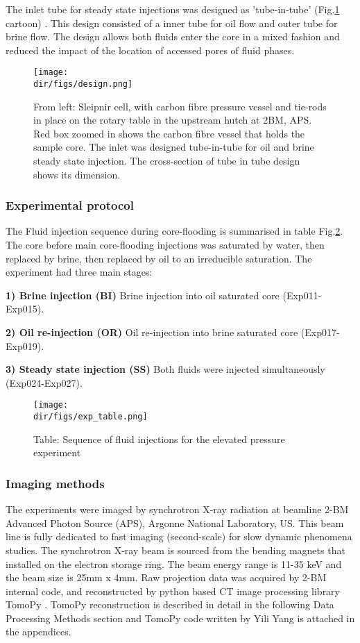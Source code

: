 The inlet tube for steady state injections was designed as 'tube-in-tube' (Fig.\ref{design} cartoon) . This design consisted of a inner tube for oil flow and outer tube for brine flow. The design allows both fluids enter the core in a mixed fashion and reduced the impact of the location of accessed pores of fluid phases.

\begin{figure}[htbp]
  \centering
  \texttt{[image: \\dir/figs/design.png]}
  \caption{From left: Sleipnir cell, with carbon fibre pressure vessel and tie-rods in place on the rotary table in the upstream hutch at 2BM, APS. Red box zoomed in shows the carbon fibre vessel that holds the sample core. The inlet was designed tube-in-tube for oil and brine steady state injection. The cross-section of tube in tube design shows its dimension.}
  \label{design}
\end{figure}

\subsubsection{Experimental protocol}
The Fluid injection sequence during core-flooding is summarised in table Fig.\ref{exptable}. The core before main core-flooding injections was saturated by water, then replaced by brine, then replaced by oil to an irreducible saturation. The experiment had three main stages:

\textbf{1) Brine injection (BI)} Brine injection into oil saturated core (Exp011-Exp015).

\textbf{2) Oil re-injection (OR)} Oil re-injection into brine saturated core (Exp017-Exp019).

\textbf{3) Steady state injection (SS)} Both fluids were injected simultaneously (Exp024-Exp027).

\begin{figure}[htbp]
  \centering
  \texttt{[image: \\dir/figs/exp\_table.png]}
  \caption{Table: Sequence of fluid injections for the elevated pressure experiment}
  \label{exptable}
\end{figure}

\subsubsection{Imaging methods}
The experiments were imaged by synchrotron X-ray radiation at beamline 2-BM Advanced Photon Source (APS), Argonne National Laboratory, US.  This beam line is fully dedicated to fast imaging (second-scale) for slow dynamic phenomena studies. The synchrotron X-ray beam is sourced from the bending magnets that installed on the electron storage ring. The beam energy range is 11-35 keV and the beam size is 25mm x 4mm. Raw projection data was acquired by 2-BM internal code, and reconstructed by python based CT image processing library TomoPy \citep{gursoy2014tomopy}. TomoPy reconstruction is described in detail in the following Data Processing Methods section and TomoPy code written by Yili Yang is attached in the appendices.

